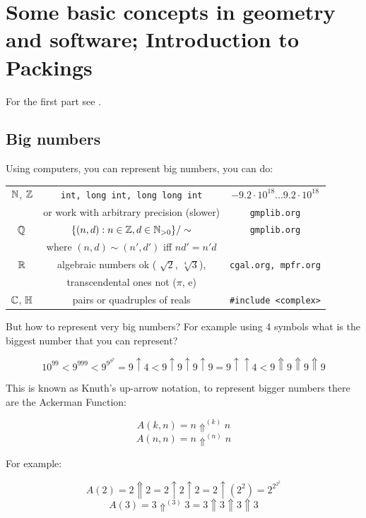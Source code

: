 \setcounter{chapter}{5}
\chapter{Some basic concepts in geometry and software; Introduction to Packings}



For the first part see \cite{Pfeifle}.
\section{Big numbers}

Using computers, you can represent big numbers, you can do: 

\renewcommand{\arraystretch}{1.5}
\begin{tabular}{|c|c|c|}
\hline
$\mathbb{N}$, $\mathbb{Z}$	 	&\texttt{int, long int, long long int} 			&$-9.2 \cdot 10^{18} ... 9.2 \cdot 10^{18}$	\\
			&or work with arbitrary precision (slower)		&\texttt{gmplib.org}				\\
\hline
$\mathbb{Q}$			&$\{(n, d) : n \in \mathbb{Z}, d \in \mathbb{N}_{>0} \}/\sim$		&\texttt{gmplib.org}				\\
			&where $(n, d) \sim (n' , d' )$ iff $nd' = n'd$		&						\\
\hline
$\mathbb{R}$			&algebraic numbers ok ( $\sqrt{2}$, $\sqrt[4]{3}$),	&\texttt{cgal.org, mpfr.org}			\\
			&transcendental ones not ($\pi$, e)			&						\\
\hline
$\mathbb{C}$, $\mathbb{H}$		&pairs or quadruples of reals				&\texttt{\#include <complex>}			\\
\hline
\end{tabular}


But how to represent very big numbers? For example using 4 symbols what is the biggest number that you can represent?

$$10^{99} < 9^{999} < 9^{9^{9^9}} = 9 \uparrow 4 < 9 \uparrow 9 \uparrow 9 \uparrow 9 = 9 \uparrow \uparrow 4 < 9 \Uparrow 9 \Uparrow 9 \Uparrow 9$$

This is known as Knuth's up-arrow notation, to represent bigger numbers there are the Ackerman Function:

$$A(k,n) = n \Uparrow^{(k)} n$$
$$A(n,n) = n \Uparrow^{(n)} n$$

For example:

$$A(2)= 2 \Uparrow 2 = 2 \uparrow 2 \uparrow 2 = 2 \uparrow \left( 2^2\right) = 2^{2^{2^2}}$$
$$A(3)= 3 \Uparrow^{(3)} 3 = 3 \Uparrow 3 \Uparrow 3 \Uparrow 3$$

